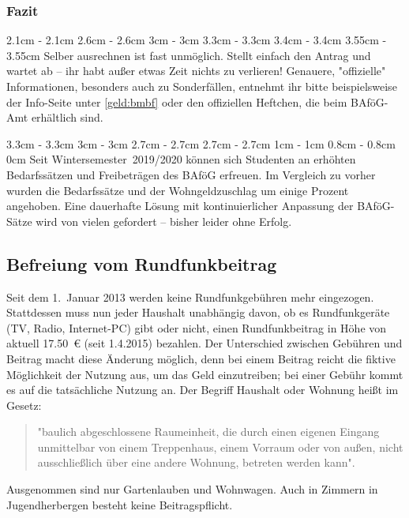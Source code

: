 \begin{multicols*}{2}
\subsubsection{Fazit}
2.1cm	\dimexpr\columnwidth - 2.1cm
2.6cm	\dimexpr\columnwidth - 2.6cm
3cm		\dimexpr\columnwidth - 3cm
3.3cm	\dimexpr\columnwidth - 3.3cm
3.4cm	\dimexpr\columnwidth - 3.4cm
3.55cm	\dimexpr\columnwidth - 3.55cm
Selber ausrechnen ist fast unmöglich.
Stellt einfach den Antrag und wartet ab -- ihr habt außer etwas Zeit nichts zu verlieren! Genauere, "offizielle" Informationen, besonders auch zu Sonderfällen, entnehmt ihr bitte beispielsweise der Info-Seite unter \cref{geld:bmbf} oder den offiziellen Heftchen, die beim BAföG-Amt erhältlich sind.

3.3cm	\dimexpr\columnwidth - 3.3cm
3cm		\dimexpr\columnwidth - 3cm
2.7cm	\dimexpr\columnwidth - 2.7cm
2.7cm	\dimexpr\columnwidth - 2.7cm
1cm		\dimexpr\columnwidth - 1cm
0.8cm	\dimexpr\columnwidth - 0.8cm
0cm \columnwidth
Seit Wintersemester~2019/2020 können sich Studenten an erhöhten Bedarfssätzen und Freibeträgen des BAföG erfreuen.
Im Vergleich zu vorher wurden die Bedarfssätze und der Wohngeldzuschlag um einige Prozent angehoben.
Eine dauerhafte Lösung mit kontinuierlicher Anpassung der BAföG-Sätze wird von vielen gefordert -- bisher leider ohne Erfolg.

\subsection{Befreiung vom Rundfunkbeitrag}
Seit dem 1.~Januar 2013 werden keine Rundfunkgebühren mehr eingezogen.
Stattdessen muss nun jeder Haushalt unabhängig davon, ob es Rundfunkgeräte (TV, Radio, Internet-PC) gibt oder nicht, einen Rundfunkbeitrag in Höhe von aktuell \SI{17,50}{\euro} (seit 1.4.2015) bezahlen.
Der Unterschied zwischen Gebühren und Beitrag macht diese Änderung möglich, denn bei einem Beitrag reicht die fiktive Möglichkeit der Nutzung aus, um das Geld einzutreiben; bei einer Gebühr kommt es auf die tatsächliche Nutzung an.
Der Begriff Haushalt oder Wohnung heißt im Gesetz:
\begin{quote}
	"baulich abgeschlossene Raumeinheit, die durch einen eigenen Eingang unmittelbar von einem Treppenhaus, einem Vorraum oder von außen, nicht ausschließlich über eine andere Wohnung, betreten werden kann".
\end{quote}
Ausgenommen sind nur Gartenlauben und Wohnwagen.
Auch in Zimmern in Jugendherbergen besteht keine Beitragspflicht.


\end{multicols*}
